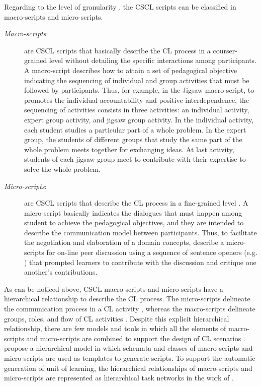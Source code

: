 Regarding to the level of granularity \cite{FischerKollarStegmannWeckerZottmann2013}, the CSCL scripts can be classified in macro-scripts and micro-scripts.

\begin{description}
\item[\emph{Macro-scripts}:] are CSCL scripts that basically describe the CL process in a courser-grained level without detailing the specific interactions among participants.
A macro-script describes how to attain a set of pedagogical objective indicating the sequencing of individual and group activities that must be followed by participants.
Thus, for example, in the Jigsaw macro-script, to promotes the individual accountability and positive interdependence, the sequencing of activities consists in three activities: an individual activity, expert group activity, and jigsaw group activity.
In the individual activity, each student studies a particular part of a whole problem.
In the expert group, the students of different groups that study the same part of the whole problem meets together for exchanging ideas.
At last activity, students of each jigsaw group meet to contribute with their expertise to solve the whole problem.

\item[\emph{Micro-scripts}:] are CSCL scripts that describe the CL process in a fine-grained level \cite{WeinbergerFischerStegmann2005}.
A micro-script basically indicates the dialogues that must happen among student to achieve the pedagogical objectives, and they are intended to describe the communication model between participants.
Thus, to facilitate the negotiation and elaboration of a domain concepts,  describe a micro-scripts for on-line peer discussion using a sequence of sentence openers (e.g. ) that prompted learners to contribute with the discussion and critique one another's contributions.
\end{description}

As can be noticed above, CSCL macro-scripts and micro-scripts have a hierarchical relationship to describe the CL process.
The micro-scripts delineate the communication process in a CL activity \cite{WeinbergerFischerStegmann2005}, whereas the macro-scripts delineate groups, roles, and flow of CL activities \cite{DillenbourgHong2008}.
Despite this explicit hierarchical relationship, there are few models and tools in which all the elements of macro-scripts and micro-scripts are combined to support the design of CL scenarios \cite{AlharbiAthaudaChiong2014, ChallcoBittencourtIsotani2016}.
 propose a hierarchical model in which schemata and classes of macro-scripts and micro-scripts are used as templates to generate scripts.
To support the automatic generation of unit of learning, the hierarchical relationships of macro-scripts and micro-scripts are represented as hierarchical task networks in the work of .

